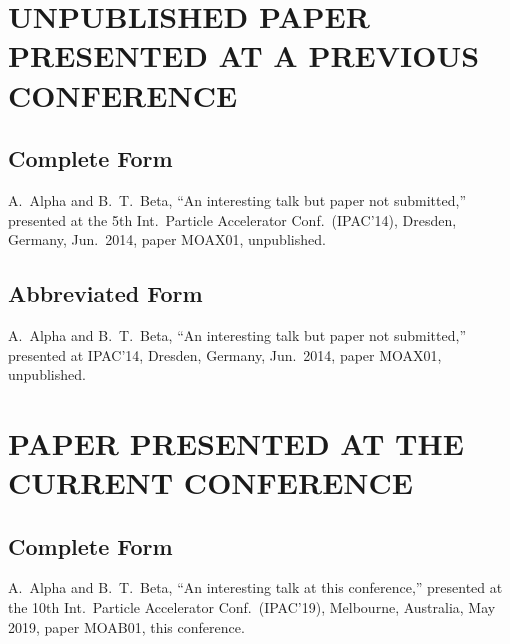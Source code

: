 \section{UNPUBLISHED PAPER PRESENTED AT A PREVIOUS CONFERENCE}


\subsection{Complete Form}

\begin{thebibliography}{9} %
\setcounter{enumi}{3}
	A.~Alpha and B.~T.~Beta,
	“An interesting talk but paper not submitted,”
	presented at the 5th Int.\ Particle Accelerator Conf.\ (IPAC’14),
	Dresden, Germany, Jun.\ 2014, paper MOAX01, unpublished.
\end{thebibliography}

\subsection{Abbreviated Form}

\begin{thebibliography}{9} %
\setcounter{enumi}{3}
	A.~Alpha and B.~T.~Beta,
	“An interesting talk but paper not submitted,”
	presented at IPAC’14,
	Dresden, Germany, Jun.\ 2014, paper MOAX01, unpublished.
\end{thebibliography}


\section{PAPER PRESENTED AT THE CURRENT CONFERENCE}

\subsection{Complete Form}

\begin{thebibliography}{9} %
\setcounter{enumi}{4}
	A.~Alpha and B.~T.~Beta,
	“An interesting talk at this conference,”
	presented at the 10th Int.\ Particle Accelerator
	Conf.\ (IPAC’19), Melbourne, Australia, May 2019, 
	paper MOAB01, this conference.
\end{thebibliography}

